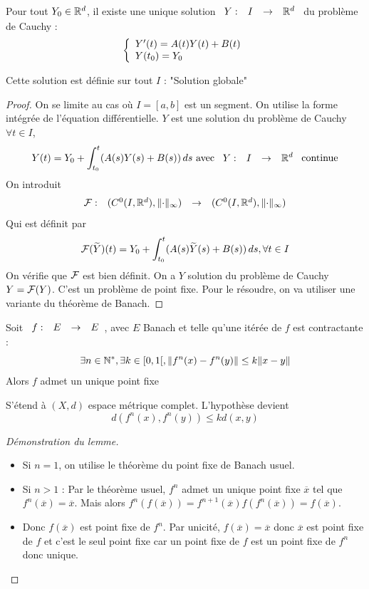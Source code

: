 \documentclass[]{report}
\begin{document}
\begin{tm}
    Pour tout $Y_0\in\mathbb{R}^d$, il existe une unique solution $\begin{array}{ccccc} Y : & I & \to & \mathbb{R}^d \end{array}$ du problème de Cauchy :
    \[\left\{\begin{array}{ll} Y'(t)=A(t)Y(t)+B(t)\\
    Y(t_0)=Y_0 \end{array} \right.\]
\end{tm}

\begin{re}
    Cette solution est définie sur tout $I$ : "Solution globale"
\end{re}

\begin{proof}
    On se limite au cas où $I=[a,b]$ est un segment. On utilise la forme intégrée de l'équation différentielle. $Y$ est une solution du problème de Cauchy \ssi $\forall t \in I$,
    \[Y(t)=Y_0+\int_{t_0}^t(A(s)Y(s)+B(s))\,ds \text{ avec $\begin{array}{ccccc} Y : & I & \to & \mathbb{R}^d \end{array}$ continue}\]
    On introduit 
    \[\begin{array}{ccccc} \mathcal{F} : & (C^0(I,\mathbb{R}^d),\lVert\cdot \rVert_{\infty}) & \to & (C^0(I,\mathbb{R}^d),\lVert \cdot \rVert_{\infty}) \end{array}\]
    Qui est définit par 
    \[\mathcal{F} (\widetilde{Y})(t)=Y_0+\int_{t_0}^t(A(s)\widetilde{Y}(s)+B(s))\,ds,\forall t\in I\]
    On vérifie que $\mathcal{F}$ est bien définit. On a $Y$ solution du problème de Cauchy \ssi $Y=\mathcal{F}(Y)$. C'est un problème de point fixe. Pour le résoudre, on va utiliser une variante du théorème de Banach.
\end{proof}

\begin{lm}
    Soit $\begin{array}{ccccc} f : & E & \to & E \end{array}$, avec $E$ Banach et telle qu'une itérée de $f$ est contractante :
    \[\exists n\in \mathbb{N}^*,\exists k\in[0,1[,\lVert f^{n}(x)-f^{n}(y) \rVert\le k\lVert x-y \rVert\]
    Alors $f$ admet un unique point fixe
\end{lm}

\begin{re}
    S'étend à $(X,d)$ espace métrique complet. L'hypothèse devient
    \[d(f^{n}(x),f^{n}(y))\le k d(x,y)\]
\end{re}

\begin{proof}[Démonstration du lemme]
    \begin{itemize}
        \item Si $n=1$, on utilise le théorème du point fixe de Banach usuel.
        \item Si $n>1$ : Par le théorème usuel, $f^{n}$ admet un unique point fixe $\overline{x}$ tel que $f^{n}(\overline{x})=\overline{x}$. Mais alors $f^{n}(f(\overline{x}))=f^{n+1}(\overline{x})f(f^n(\overline{x}))=f(\overline{x})$.\\
        \item Donc $f(\overline{x})$ est point fixe de $f^n$. Par unicité, $f(\overline{x})=\overline{x}$ donc $\overline{x}$ est point fixe de $f$ et c'est le seul point fixe car un point fixe de $f$ est un point fixe de $f^n$ donc unique.
    \end{itemize}
\end{proof}
\end{document}
